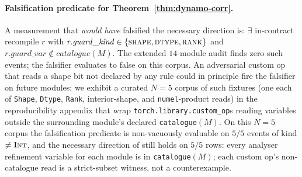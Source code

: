 \paragraph{Falsification predicate for Theorem~\ref{thm:dynamo-corr}.}
A measurement that \emph{would have} falsified the necessary
direction is: $\exists$ in-contract recompile $r$ with
$r.\mathit{guard\_kind}\in\{\textsc{shape},\textsc{dtype},\textsc{rank}\}$
and $r.\mathit{guard\_var}\notin\mathit{catalogue}(M)$. The extended
$14$-module audit finds zero such events; the falsifier
evaluates to false on this corpus.
An adversarial custom op that reads a shape bit not declared
by any rule could in principle fire the falsifier on future
modules; we exhibit a curated $N{=}5$ corpus of such fixtures
(one each of \texttt{Shape}, \texttt{Dtype}, \texttt{Rank},
interior-shape, and \texttt{numel}-product reads) in the
reproducibility appendix that wrap
\texttt{torch.library.custom\_op}s reading variables outside
the surrounding module's declared
\texttt{catalogue}$(M)$. On this $N{=}5$ corpus the falsification
predicate is non-vacuously evaluable on $5/5$ events of kind
$\ne\textsc{Int}$, and the necessary direction of
 still holds on $5/5$ rows: every
analyser refinement variable for each module is in
\texttt{catalogue}$(M)$; each custom op's non-catalogue read is
a strict-subset witness, not a counterexample.

